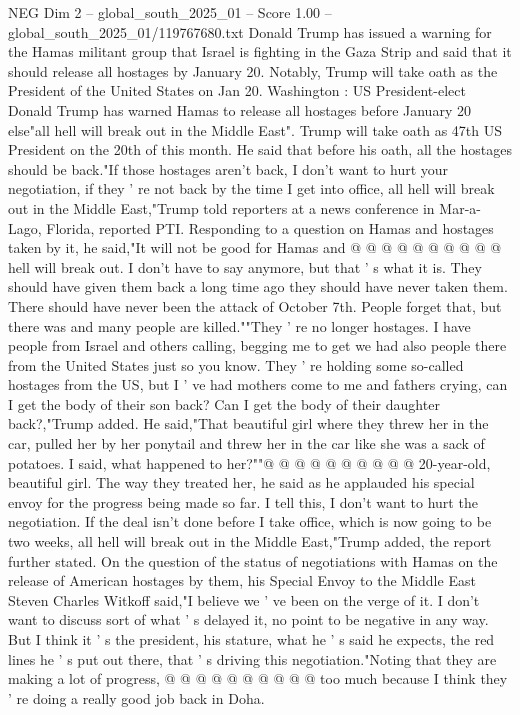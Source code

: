 \begin{textsample}{NEG Dim 2 – global\_south\_2025\_01 – Score 1.00 – global\_south\_2025\_01/119767680.txt}  \label{ex:f2_neg_134}
Donald Trump has issued a warning for the Hamas militant group that Israel is fighting in the Gaza Strip and said that it should release all hostages by January 20.
Notably, Trump will take oath as the President of the United States on Jan 20.
Washington : US President-elect Donald Trump has warned Hamas to release all hostages before January 20 else"all hell will break out in the Middle East".
Trump will take oath as 47th US President on the 20th of this month.
He said that before his oath, all the hostages should be back."If those hostages aren't back, I don't want to hurt your negotiation, if they ' re not back by the time I get into office, all hell will break out in the Middle East,"Trump told reporters at a news conference in Mar-a-Lago, Florida, reported PTI.
Responding to a question on Hamas and hostages taken by it, he said,"It will not be good for Hamas and @ @ @ @ @ @ @ @ @ @ hell will break out.
I don't have to say anymore, but that ' s what it is.
They should have given them back a long time ago they should have never taken them.
There should have never been the attack of October 7th.
People forget that, but there was and many people are killed.""They ' re no longer hostages.
I have people from Israel and others calling, begging me to get we had also people there from the United States just so you know.
They ' re holding some so-called hostages from the US, but I ' ve had mothers come to me and fathers crying, can I get the body of their son back?
Can I get the body of their daughter back?,"Trump added.
He said,"That beautiful girl where they threw her in the car, pulled her by her ponytail and threw her in the car like she was a sack of potatoes.
I said, what happened to her?""@ @ @ @ @ @ @ @ @ @ 20-year-old, beautiful girl.
The way they treated her, he said as he applauded his special envoy for the progress being made so far.
I tell this, I don't want to hurt the negotiation.
If the deal isn't done before I take office, which is now going to be two weeks, all hell will break out in the Middle East,"Trump added, the report further stated.
On the question of the status of negotiations with Hamas on the release of American hostages by them, his Special Envoy to the Middle East Steven Charles Witkoff said,"I believe we ' ve been on the verge of it.
I don't want to discuss sort of what ' s delayed it, no point to be negative in any way.
But I think it ' s the president, his stature, what he ' s said he expects, the red lines he ' s put out there, that ' s driving this negotiation."Noting that they are making a lot of progress, @ @ @ @ @ @ @ @ @ @ too much because I think they ' re doing a really good job back in Doha.

\end{textsample}
